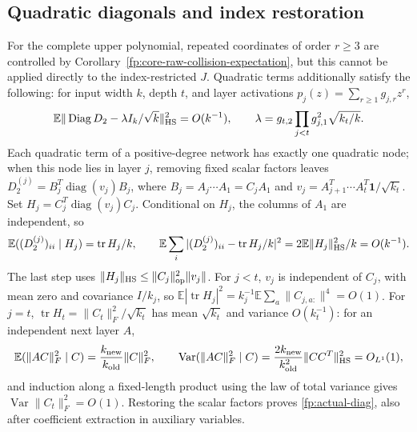 \documentclass[a4paper]{tufte-handout}
\newcommand{\E}{\mathbb E}
\DeclareMathOperator{\tr}{tr}
\begin{document}
\begin{fullwidth}
\subsection{Quadratic diagonals and index restoration}
\label{fp:actual-quadratic}\label{fp:actual-telescope}
For the complete upper polynomial, repeated coordinates of order $r\ge3$ are controlled by Corollary~\ref{fp:core-raw-collision-expectation},
but this cannot be applied directly to the index-restricted $J$. Quadratic terms additionally satisfy the following:
for input width $k$, depth $t$, and layer activations $p_j(z)=\sum_{r\ge1}g_{j,r}z^r$,
\begin{equation}\label{fp:actual-diag}
 \E\|\operatorname{Diag}D_2-\lambda I_k/\sqrt k\|_{\rm HS}^2=O(k^{-1}),
 \qquad \lambda=g_{t,2}\prod_{j<t}g_{j,1}^2\sqrt{k_t/k}.
\end{equation}
Each quadratic term of a positive-degree network has exactly one quadratic node; when this node lies in layer $j$, removing fixed scalar factors leaves
$D_2^{(j)}=B_j^T\operatorname{diag}(v_j)B_j$, where
$B_j=A_j\cdots A_1=C_jA_1$ and $v_j=A_{j+1}^T\cdots A_t^T\mathbf1/\sqrt{k_t}$.
Set $H_j=C_j^T\operatorname{diag}(v_j)C_j$. Conditional on $H_j$, the columns of $A_1$ are independent, so
\[
 \E((D_2^{(j)})_{ii}\mid H_j)=\tr H_j/k,\qquad
 \E\sum_i|(D_2^{(j)})_{ii}-\tr H_j/k|^2=2\E\|H_j\|_{\rm HS}^2/k=O(k^{-1}).
\]
The last step uses $\|H_j\|_{\rm HS}\le\|C_j\|_{\rm op}^2\|v_j\|$.
For $j<t$, $v_j$ is independent of $C_j$, with mean zero and covariance $I/k_j$, so
$\E|\tr H_j|^2=k_j^{-1}\E\sum_a\|C_{j,a:}\|^4=O(1)$.
For $j=t$, $\tr H_t=\|C_t\|_F^2/\sqrt{k_t}$ has mean $\sqrt{k_t}$ and variance $O(k_t^{-1})$:
for an independent next layer $A$,
\[
 \E(\|AC\|_F^2\mid C)=\frac{k_{\rm new}}{k_{\rm old}}\|C\|_F^2,
 \qquad \operatorname{Var}(\|AC\|_F^2\mid C)
 =\frac{2k_{\rm new}}{k_{\rm old}^2}\|CC^T\|_{\rm HS}^2=O_{L^1}(1),
\]
and induction along a fixed-length product using the law of total variance gives $\operatorname{Var}\|C_t\|_F^2=O(1)$.
Restoring the scalar factors proves \eqref{fp:actual-diag}, also after coefficient extraction in auxiliary variables.


\end{fullwidth}
\end{document}
